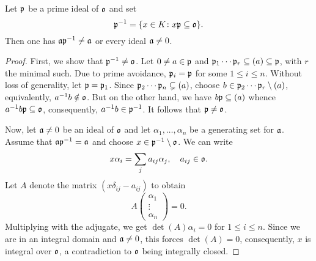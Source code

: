 \begin{lemma}
    Let $\mathfrak{p}$ be a prime ideal of $\mathfrak{o}$ and set 
    \begin{equation*}
        \mathfrak{p}^{-1} = \{x\in K\colon x\mathfrak{p}\subseteq\mathfrak{o}\}.
    \end{equation*}
    Then one has $\mathfrak{a}\mathfrak{p}^{-1}\ne\mathfrak{a}$ or every ideal $\mathfrak{a}\ne 0$.
\end{lemma}
\begin{proof}
    First, we show that $\mathfrak{p}^{-1}\ne\mathfrak{o}$. Let $0\ne a\in\mathfrak{p}$ and $\mathfrak{p}_1\cdots\mathfrak{p}_r\subseteq(a)\subseteq\mathfrak{p}$, with $r$ the minimal such. Due to prime avoidance, $\mathfrak{p}_i = \mathfrak{p}$ for some $1\le i\le n$. Without loss of generality, let $\mathfrak{p} = \mathfrak{p}_1$. Since $\mathfrak{p}_2\cdots\mathfrak{p}_n\subsetneq(a)$, choose $b\in\mathfrak{p}_2\cdots\mathfrak{p}_r\setminus(a)$, equivalently, $a^{-1}b\notin\mathfrak{o}$. But on the other hand, we have $b\mathfrak{p}\subseteq(a)$ whence $a^{-1}b\mathfrak{p}\subseteq\mathfrak{o}$, consequently, $a^{-1}b\in\mathfrak{p}^{-1}$. It follows that $\mathfrak{p}\ne\mathfrak{o}$.

    Now, let $\mathfrak{a}\ne 0$ be an ideal of $\mathfrak{o}$ and let $\alpha_1,\dots,\alpha_n$ be a generating set for $\mathfrak{a}$. Assume that $\mathfrak{a}\mathfrak{p}^{-1} = \mathfrak{a}$ and choose $x\in\mathfrak{p}^{-1}\setminus\mathfrak{o}$. We can write 
    \begin{equation*}
        x\alpha_i = \sum_{j} a_{ij}\alpha_j,\quad a_{ij}\in\mathfrak{o}.
    \end{equation*}
    Let $A$ denote the matrix $\left(x\delta_{ij} - a_{ij}\right)$ to obtain 
    \begin{equation*}
        A
        \begin{pmatrix}
            \alpha_1\\\vdots\\\alpha_n
        \end{pmatrix}
        = 0.
    \end{equation*}
    Multiplying with the adjugate, we get $\det(A)\alpha_i = 0$ for $1\le i\le n$. Since we are in an integral domain and $\mathfrak{a}\ne 0$, this forces $\det(A) = 0$, consequently, $x$ is integral over $\mathfrak{o}$, a contradiction to $\mathfrak{o}$ being integrally closed.
\end{proof}

